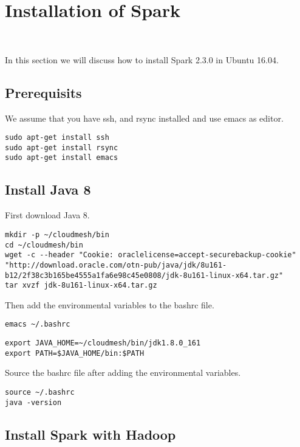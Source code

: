 \section{Installation of Spark}
\label{c:spark-local-installation}
\FILENAME\

In this section we will discuss how to install Spark 2.3.0 in Ubuntu 16.04.

\subsection{Prerequisits}

We assume that you have ssh, and rsync installed and
use emacs as editor. 

\begin{lstlisting}
sudo apt-get install ssh
sudo apt-get install rsync
sudo apt-get install emacs
\end{lstlisting}

\subsection{Install Java 8}

First download Java 8.

\begin{lstlisting}
mkdir -p ~/cloudmesh/bin
cd ~/cloudmesh/bin
wget -c --header "Cookie: oraclelicense=accept-securebackup-cookie" "http://download.oracle.com/otn-pub/java/jdk/8u161-b12/2f38c3b165be4555a1fa6e98c45e0808/jdk-8u161-linux-x64.tar.gz"
tar xvzf jdk-8u161-linux-x64.tar.gz
\end{lstlisting}

Then add the environmental variables to the bashrc file. 

\begin{lstlisting}
emacs ~/.bashrc
\end{lstlisting}

\begin{lstlisting}
export JAVA_HOME=~/cloudmesh/bin/jdk1.8.0_161
export PATH=$JAVA_HOME/bin:$PATH
\end{lstlisting}

Source the bashrc file after adding the environmental variables.

\begin{lstlisting}
source ~/.bashrc
java -version
\end{lstlisting}

\subsection{Install Spark with Hadoop}

